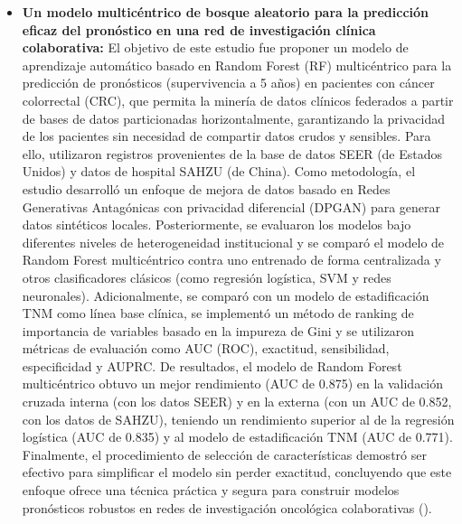 \begin{itemize}
    \item \textbf{Un modelo multicéntrico de bosque aleatorio para la predicción eficaz del pronóstico en una red de investigación clínica colaborativa:} El objetivo de este estudio fue proponer un modelo de aprendizaje automático basado en Random Forest (RF) multicéntrico para la predicción de pronósticos (supervivencia a 5 años) en pacientes con cáncer colorrectal (CRC), que permita la minería de datos clínicos federados a partir de bases de datos particionadas horizontalmente, garantizando la privacidad de los pacientes sin necesidad de compartir datos crudos y sensibles. Para ello, utilizaron registros provenientes de la base de datos SEER (de Estados Unidos) y datos de hospital SAHZU (de China). Como metodología, el estudio desarrolló un enfoque de mejora de datos basado en Redes Generativas Antagónicas con privacidad diferencial (DPGAN) para generar datos sintéticos locales. Posteriormente, se evaluaron los modelos bajo diferentes niveles de heterogeneidad institucional y se comparó el modelo de Random Forest multicéntrico contra uno entrenado de forma centralizada y otros clasificadores clásicos (como regresión logística, SVM y redes neuronales). Adicionalmente, se comparó con un modelo de estadificación TNM como línea base clínica, se implementó un método de ranking de importancia de variables basado en la impureza de Gini y se utilizaron métricas de evaluación como AUC (ROC), exactitud, sensibilidad, especificidad y AUPRC. De resultados, el modelo de Random Forest multicéntrico obtuvo un mejor rendimiento (AUC de 0.875) en la validación cruzada interna (con los datos SEER) y en la externa (con un AUC de 0.852, con los datos de SAHZU), teniendo un rendimiento superior al de la regresión logística (AUC de 0.835) y al modelo de estadificación TNM (AUC de 0.771). Finalmente, el procedimiento de selección de características demostró ser efectivo para simplificar el modelo sin perder exactitud, concluyendo que este enfoque ofrece una técnica práctica y segura para construir modelos pronósticos robustos en redes de investigación oncológica colaborativas (\cite{article11}).

\end{itemize}
